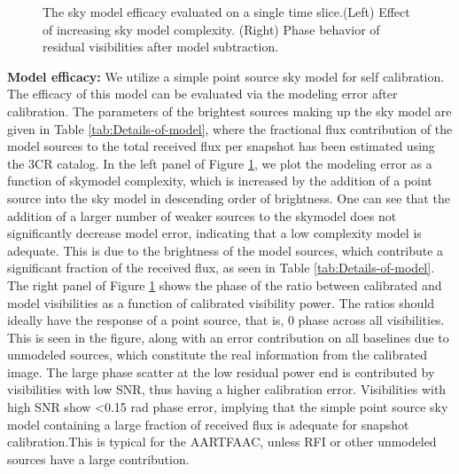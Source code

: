 \documentclass{aa}
\begin{document}
\begin{figure}[tbh]
\caption{\label{fig:The-model-amplitude}The  sky model  efficacy evaluated  on a
  single  time slice.(Left) Effect  of increasing  sky model  complexity. (Right)
  Phase behavior of residual visibilities after model subtraction.}
\end{figure}

\textbf{Model efficacy:  } We utilize a  simple point source sky  model for self
calibration. The efficacy of this model  can be evaluated via the modeling error
after calibration.   The parameters of the  brightest sources making  up the sky
model are  given in Table \ref{tab:Details-of-model}, where  the fractional flux
contribution of  the model sources to  the total received flux  per snapshot has
been  estimated   using  the  3CR  catalog.    In  the  left   panel  of  Figure
\ref{fig:The-model-amplitude},  we plot  the  modeling error  as  a function  of
skymodel complexity, which  is increased by the addition of  a point source into
the sky model  in descending order of brightness. One can  see that the addition
of a  larger number  of weaker  sources to the  skymodel does  not significantly
decrease model error, indicating that  a low complexity model is adequate.  This
is due  to the brightness of  the model sources, which  contribute a significant
fraction of the received flux, as seen in Table \ref{tab:Details-of-model}.  The
right panel of Figure \ref{fig:The-model-amplitude} shows the phase of the ratio
between calibrated and model visibilities as a function of calibrated visibility
power. The ratios should ideally have the response of a point source, that is, 0
phase across all visibilities.  This is  seen in the figure, along with an error
contribution on  all baselines  due to unmodeled  sources, which  constitute the
real information from  the calibrated image. The large phase  scatter at the low
residual power  end is contributed by  visibilities with low SNR,  thus having a
higher  calibration error.   Visibilities with  high  SNR show  <0.15 rad  phase
error,  implying that  the  simple point  source  sky model  containing a  large
fraction of received  flux is adequate for snapshot  calibration.This is typical
for  the  AARTFAAC,  unless  RFI   or  other  unmodeled  sources  have  a  large
contribution.
\end{document}
